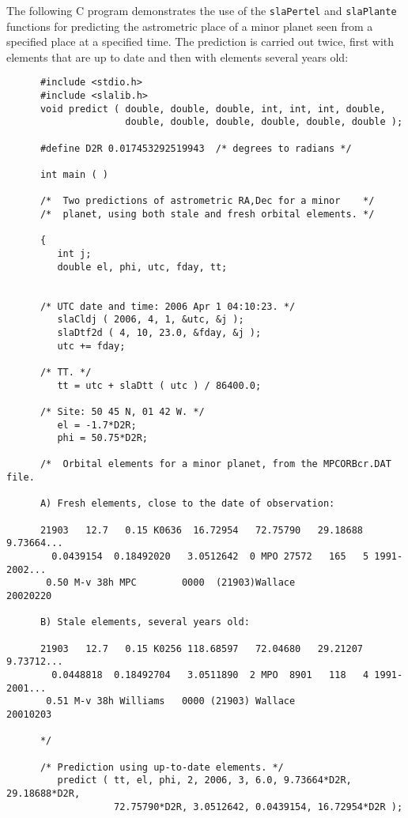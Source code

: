 \documentclass[11pt,fleqn,twoside]{article}
\renewcommand{\_}{{\tt\char'137}}     %
\begin{document}
The following C program demonstrates the use of the
{\tt slaPertel} and
{\tt slaPlante} functions for
predicting the astrometric place of a minor planet seen from a specified
place at a specified time.  The prediction is carried out twice,
first with elements that are up to date and then with elements several
years old:
\goodbreak
\vspace{-3ex}
\begin{verbatim}
      #include <stdio.h>
      #include <slalib.h>
      void predict ( double, double, double, int, int, int, double,
                     double, double, double, double, double, double );

      #define D2R 0.017453292519943  /* degrees to radians */

      int main ( )

      /*  Two predictions of astrometric RA,Dec for a minor    */
      /*  planet, using both stale and fresh orbital elements. */

      {
         int j;
         double el, phi, utc, fday, tt;


      /* UTC date and time: 2006 Apr 1 04:10:23. */
         slaCldj ( 2006, 4, 1, &utc, &j );
         slaDtf2d ( 4, 10, 23.0, &fday, &j );
         utc += fday;

      /* TT. */
         tt = utc + slaDtt ( utc ) / 86400.0;

      /* Site: 50 45 N, 01 42 W. */
         el = -1.7*D2R;
         phi = 50.75*D2R;

      /*  Orbital elements for a minor planet, from the MPCORBcr.DAT file.

      A) Fresh elements, close to the date of observation:

      21903   12.7   0.15 K0636  16.72954   72.75790   29.18688    9.73664...
        0.0439154  0.18492020   3.0512642  0 MPO 27572   165   5 1991-2002...
       0.50 M-v 38h MPC        0000  (21903)Wallace             20020220

      B) Stale elements, several years old:

      21903   12.7   0.15 K0256 118.68597   72.04680   29.21207    9.73712...
        0.0448818  0.18492704   3.0511890  2 MPO  8901   118   4 1991-2001...
       0.51 M-v 38h Williams   0000 (21903) Wallace             20010203

      */

      /* Prediction using up-to-date elements. */
         predict ( tt, el, phi, 2, 2006, 3, 6.0, 9.73664*D2R, 29.18688*D2R,
                   72.75790*D2R, 3.0512642, 0.0439154, 16.72954*D2R );


\end{verbatim}
\end{document}
